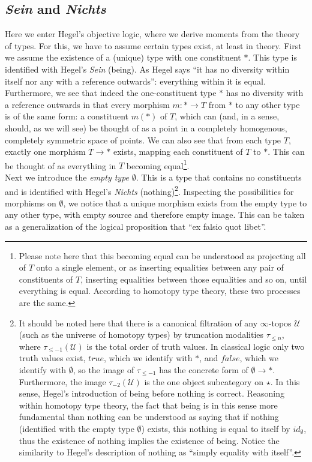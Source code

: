 \documentclass{article}
\begin{document}
\subsection{\emph{Sein} and \emph{Nichts}}
Here we enter Hegel's objective logic, where we derive moments from the theory of types. For this, we have to assume certain types exist, at least in theory. First we assume the existence of a (unique) type with one constituent $*$. This type is identified with Hegel's \emph{Sein} (being). As Hegel says ``it has no diversity within itself nor any with a reference outwards'': everything within it is equal. Furthermore, we see that indeed the one-constituent type $*$ has no diversity with a reference outwards in that every morphism $m:*\rightarrow T$ from $*$ to any other type is of the same form: a constituent $m(*)$ of $T$, which can (and, in a sense, should, as we will see) be thought of as a point in a completely homogenous, completely symmetric space of points. We can also see that from each type $T$, exactly one morphism $T\rightarrow *$ exists, mapping each constituent of $T$ to $*$. This can be thought of as everything in $T$ becoming equal\footnote{Please note here that this becoming equal can be understood as projecting all of $T$ onto a single element, or as inserting equalities between any pair of constituents of $T$, inserting equalities between those equalities and so on, until everything is equal. According to homotopy type theory, these two processes are the same.}. \\ 

Next we introduce the \emph{empty type} $\emptyset$. This is a type that contains no constituents and is identified with Hegel's \emph{Nichts} (nothing)\footnote{It should be noted here that there is a canonical filtration of any $\infty$-topos $\mathcal{U}$ (such as the universe of homotopy types) by truncation modalities $\tau_{\leq n}$, where $\tau_{\leq -1}(\mathcal{U})$ is the total order of truth values. In classical logic only two truth values exist, $true$, which we identify with $*$, and $false$, which we identify with $\emptyset$, so the image of $\tau_{\leq -1}$ has the concrete form of $\emptyset\rightarrow *$. Furthermore, the image $\tau_{-2}(\mathcal{U})$ is the one object subcategory on $\star$. In this sense, Hegel's introduction of being before nothing is correct. Reasoning within homotopy type theory, the fact that being is in this sense more fundamental than nothing can be understood as saying that if nothing (identified with the empty type $\emptyset$) exists, this nothing is equal to itself by $id_\emptyset$, thus the existence of nothing implies the existence of being. Notice the similarity to Hegel's description of nothing as ``simply equality with itself''.}. Inspecting the possibilities for morphisms on $\emptyset$, we notice that a unique morphism exists from the empty type to any other type, with empty source and therefore empty image. This can be taken as a generalization of the logical proposition that ``ex falsio quot libet''. \\
\end{document}

